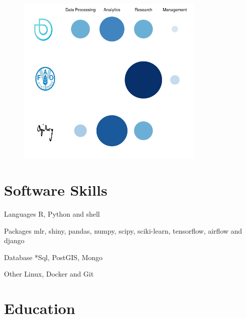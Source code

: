 \documentclass{tccv}
\begin{document}
\begin{figure}%
  \centering
  \includegraphics[width=9cm]{experience_association.jpeg}
\end{figure}


\section{Software Skills}
\begin{factlist}
\item{Languages}
  {R, Python and shell}
\item{Packages} {mlr, shiny, pandas, numpy, scipy, sciki-learn,
  tensorflow, airflow and django}
\item{Database}
  {*Sql, PostGIS, Mongo}
\item{Other}
     {Linux, Docker and Git}
\end{factlist}




\section{Education}
\end{document}

